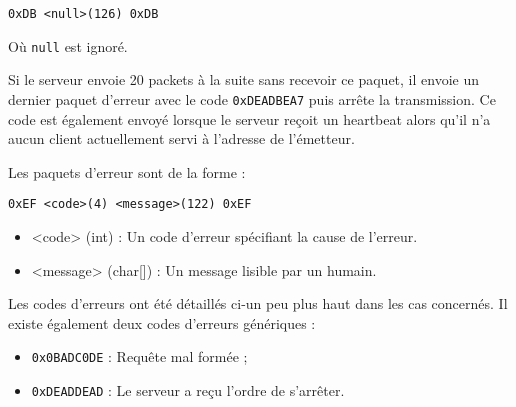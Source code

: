 \documentclass[a4paper,10pt,openany,oneside]{report}
\begin{document}
\begin{verbatim}
0xDB <null>(126) 0xDB
\end{verbatim}

Où \texttt{null} est ignoré.

Si le serveur envoie 20 packets à la suite sans recevoir ce paquet, il envoie
un dernier paquet d'erreur avec le code \texttt{0xDEADBEA7} puis arrête la
transmission. Ce code est également envoyé lorsque le serveur reçoit un
heartbeat alors qu'il n'a aucun client actuellement servi à l'adresse de
l'émetteur.

Les paquets d'erreur sont de la forme :

\begin{verbatim}
0xEF <code>(4) <message>(122) 0xEF
\end{verbatim}

\begin{itemize}
    \item <code> (int) : Un code d'erreur spécifiant la cause de l'erreur.
    \item <message> (char[]) : Un message lisible par un humain.
\end{itemize}

Les codes d'erreurs ont été détaillés ci-un peu plus haut dans les cas
concernés. Il existe également deux codes d'erreurs génériques :

\begin{itemize}
    \item \texttt{0x0BADC0DE} : Requête mal formée ;
    \item \texttt{0xDEADDEAD} : Le serveur a reçu l'ordre de s'arrêter.
\end{itemize}
\end{document}
